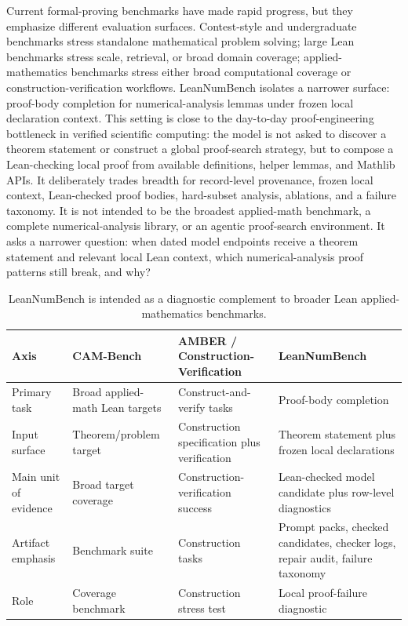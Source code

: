 \documentclass{article}
\begin{document}
Current formal-proving benchmarks have made rapid progress, but they emphasize
different evaluation surfaces. Contest-style and undergraduate benchmarks
stress standalone mathematical problem solving; large Lean benchmarks stress
scale, retrieval, or broad domain coverage; applied-mathematics benchmarks
stress either broad computational coverage or construction-verification
workflows. LeanNumBench isolates a narrower surface: proof-body completion for
numerical-analysis lemmas under frozen local declaration context. This setting
is close to the day-to-day proof-engineering bottleneck in verified scientific
computing: the model is not asked to discover a theorem statement or construct
a global proof-search strategy, but to compose a Lean-checking local proof from
available definitions, helper lemmas, and Mathlib APIs. It deliberately trades
breadth for record-level provenance, frozen local context, Lean-checked proof
bodies, hard-subset analysis, ablations, and a failure taxonomy. It is not
intended to be the broadest applied-math benchmark, a complete numerical-analysis
library, or an agentic proof-search environment. It asks a narrower question:
when dated model endpoints receive a theorem statement and relevant local Lean
context, which numerical-analysis proof patterns still break, and why?

\begin{table}[H]
\centering
\caption{LeanNumBench is intended as a diagnostic complement to broader Lean applied-mathematics benchmarks.}
\label{tab:benchmark-positioning}
\scriptsize
\begin{tabularx}{\linewidth}{lYYY}
\toprule
Axis & CAM-Bench & AMBER / Construction-Verification & LeanNumBench\\
\midrule
Primary task & Broad applied-math Lean targets & Construct-and-verify tasks
& Proof-body completion\\
Input surface & Theorem/problem target & Construction specification plus
verification & Theorem statement plus frozen local declarations\\
Main unit of evidence & Broad target coverage & Construction-verification
success & Lean-checked model candidate plus row-level diagnostics\\
Artifact emphasis & Benchmark suite & Construction tasks & Prompt packs,
checked candidates, checker logs, repair audit, failure taxonomy\\
Role & Coverage benchmark & Construction stress test & Local proof-failure
diagnostic\\
\bottomrule
\end{tabularx}
\end{table}
\end{document}
